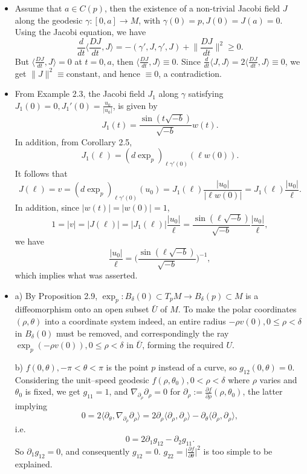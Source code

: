 \begin{itemize}
    \item[3.] Assume that $a\in C(p)$, then the existence of 
    a non-trivial Jacobi field $J$ along the geodesic $\gamma\colon[0,a]\to M$, 
    with $\gamma(0)=p,J(0)=J(a)=0$. Using the Jacobi equation, we have
    \[\frac{d}{dt}\bigg\langle\frac{DJ}{dt},J\bigg\rangle
    =-(\gamma',J,\gamma',J)+\bigg\|\frac{DJ}{dt}\bigg\|^2\ge0.\]
    But $\big\langle\frac{DJ}{dt},J\big\rangle=0$ at $t=0,a$, 
    then $\big\langle\frac{DJ}{dt},J\big\rangle\equiv0$. 
    Since $\frac{d}{dt}\langle J,J \rangle
    =2\big\langle\frac{DJ}{dt},J\big\rangle\equiv0$, 
    we get $\|J\|^2\equiv\text{constant}$, 
    and hence $\equiv0$, a contradiction.

    \item[4.] From Example 2.3, the Jacobi field $J_1$ along $\gamma$ 
    satisfying $J_1(0)=0,J_1'(0)=\frac{u_0}{|u_0|}$, is given by
    \[J_1(t)=\frac{\sin(t\sqrt{-b})}{\sqrt{-b}}w(t).\]
    In addition, from Corollary 2.5,
    \[J_1(\ell)=(d\exp_p)_{\ell\gamma'(0)}(\ell w(0)).\]
    It follows that
    \[J(\ell)=v=(d\exp_p)_{\ell\gamma'(0)}(u_0)
    =J_1(\ell)\frac{|u_0|}{|\ell w(0)|}=J_1(\ell)\frac{|u_0|}{\ell}.\]
    In addition, since $|w(t)|=|w(0)|=1$,
    \[1=|v|=|J(\ell)|=|J_1(\ell)|\frac{|u_0|}{\ell}
    =\frac{\sin(\ell\sqrt{-b})}{\sqrt{-b}}\frac{|u_0|}{\ell},\]
    we have
    \[\frac{|u_0|}{\ell}=\bigg(\frac{\sin(\ell\sqrt{-b})}{\sqrt{-b}}\bigg)^{-1},\]
    which implies what was asserted.

    \item[6.] a) By Proposition 2.9, 
    $\exp_p\colon B_\delta(0)\subset T_pM \to B_\delta(p)\subset M$ 
    is a diffeomorphism onto an open subset $\bar{U}$ of $M$. 
    To make the polar coordinates $(\rho,\theta)$ into 
    a coordinate system indeed, an entire radius 
    $-\rho v(0),0\le\rho<\delta$ in $B_\delta(0)$ must be removed, 
    and correspondingly the ray $\exp_p(-\rho v(0)),0\le\rho<\delta$ 
    in $\bar{U}$, forming the required $U$.

    b) $f(0,\theta),-\pi<\theta<\pi$ is the point $p$ 
    instead of a curve, so $g_{12}(0,\theta)=0$. 
    Considering the unit--speed geodesic $f(\rho,\theta_0),0<\rho<\delta$ 
    where $\rho$ varies and $\theta_0$ is fixed, we get $g_{11}=1$, 
    and $\nabla_{\partial_\rho}\partial_\rho=0$ 
    for $\partial_\rho:=\frac{\partial f}{\partial\rho}(\rho,\theta_0)$, 
    the latter implying
    \[0=2\langle\partial_\theta,\nabla_{\partial_\rho}\partial_\rho\rangle
    =2\partial_\rho\langle\partial_\rho,\partial_\rho\rangle
    -\partial_\theta\langle\partial_\rho,\partial_\rho\rangle,\]
    i.e.
    \[0=2\partial_1g_{12}-\partial_2g_{11}.\]
    So $\partial_1g_{12}=0$, and consequently $g_{12}=0$. 
    $g_{22}=\big|\frac{\partial f}{\partial\theta}\big|^2$ 
    is too simple to be explained.


\end{itemize}
